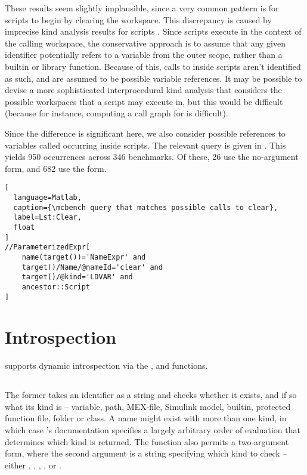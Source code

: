 
These results seem slightly implausible, since a very common pattern is for
\matlab scripts to begin by clearing the workspace. This discrepancy is caused
by imprecise kind analysis results for scripts \cite{KindAnalysis}. Since
scripts execute in the context of the calling workspace, the conservative
approach is to assume that any given identifier potentially refers to a
variable from the outer scope, rather than a builtin or library function.
Because of this, calls to  inside scripts aren't identified as
such, and are assumed to be possible variable references. It may be possible to
devise a more sophisticated interprocedural kind analysis that considers the
possible workspaces that a script may execute in, but this would be difficult
(because for instance, computing a call graph for \matlab is difficult).

Since the difference is significant here, we also consider possible references
to variables called  occurring inside scripts. The relevant query
is given in . This yields 950 occurrences across
346 benchmarks. Of these, 26 use the no-argument form, and 682 use the
 form.

\begin{lstlisting}[
  language=Matlab,
  caption={\mcbench query that matches possible calls to clear},
  label=Lst:Clear,
  float
]
//ParameterizedExpr[
    name(target())='NameExpr' and
    target()/Name/@nameId='clear' and
    target()/@kind='LDVAR' and
    ancestor::Script
]
\end{lstlisting}

\section{Introspection}

\matlab supports dynamic introspection via the ,  and
 functions.

\subsection{}

The former takes an identifier as a string and checks whether it exists, and if
so what its kind is -- variable, path, MEX-file, Simulink model, builtin,
protected function file, folder or class. A name might exist with more than one
kind, in which case \matlab's documentation specifies a largely arbitrary order
of evaluation that determines which kind is returned. The function also permits
a two-argument form, where the second argument is a string specifying which
kind to check -- either , , ,
, or .

